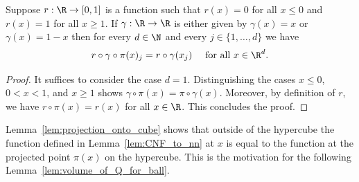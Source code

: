 \documentclass{amsart}[11pt]
\numberwithin{equation}{section}
\numberwithin{theorem}{section}
\begin{document}
\begin{lemma}\label{lem:projection_onto_cube}
    Suppose $r: \R \to [0, 1]$ is a function such that $r(x) = 0$ for all $x \leq 0$ and $r(x) = 1$ for all $x \geq 1$. If $\gamma: \R \to \R$ is either given by $\gamma(x) = x$ or $\gamma(x) = 1 - x$ then for every $d \in \N$ and every $j \in \{1, \ldots, d\}$ we have 
    \begin{align*}
        r \circ \gamma \circ \pi(x)_j = r \circ \gamma(x_j) \quad \text{ for all } x \in \R^d.
    \end{align*}
\end{lemma}
\begin{proof}
    It suffices to consider the case $d=1$. Distinguishing the cases $x\leq 0$, $0<x<1$, and $x\geq 1$ shows $\gamma\circ \pi(x) = \pi \circ \gamma(x)$. Moreover, by definition of $r$, we have $r\circ \pi(x) =r(x)$ for all $x\in\R$. This concludes the proof.
\end{proof}

Lemma~\ref{lem:projection_onto_cube} shows that outside of the hypercube the function defined in Lemma~\ref{lem:CNF_to_nn} at $x$ is equal to the function at the projected point $\pi(x)$ on the hypercube. This is the motivation for the following Lemma~\ref{lem:volume_of_Q_for_ball}.
\end{document}
